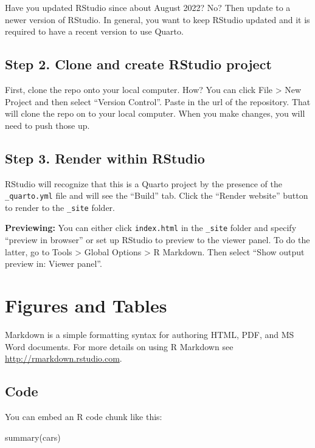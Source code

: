 \documentclass[
  letterpaper,
  oneside,
  open=any]{scrbook}
\newenvironment{Shaded}{\begin{snugshade}}{\end{snugshade}}
\newcommand{\FunctionTok}[1]{\textcolor[rgb]{0.28,0.35,0.67}{#1}}
\newcommand{\NormalTok}[1]{\textcolor[rgb]{0.00,0.23,0.31}{#1}}
\begin{document}
Have you updated RStudio since about August 2022? No? Then update to a
newer version of RStudio. In general, you want to keep RStudio updated
and it is required to have a recent version to use Quarto.

\section{Step 2. Clone and create RStudio
project}\label{step-2.-clone-and-create-rstudio-project}

First, clone the repo onto your local computer. How? You can click File
\textgreater{} New Project and then select ``Version Control''. Paste in
the url of the repository. That will clone the repo on to your local
computer. When you make changes, you will need to push those up.

\section{Step 3. Render within
RStudio}\label{step-3.-render-within-rstudio}

RStudio will recognize that this is a Quarto project by the presence of
the \texttt{\_quarto.yml} file and will see the ``Build'' tab. Click the
``Render website'' button to render to the \texttt{\_site} folder.

\textbf{Previewing:} You can either click \texttt{index.html} in the
\texttt{\_site} folder and specify ``preview in browser'' or set up
RStudio to preview to the viewer panel. To do the latter, go to Tools
\textgreater{} Global Options \textgreater{} R Markdown. Then select
``Show output preview in: Viewer panel''.


\chapter{Figures and Tables}\label{figures-and-tables}

Markdown is a simple formatting syntax for authoring HTML, PDF, and MS
Word documents. For more details on using R Markdown see
\url{http://rmarkdown.rstudio.com}.

\section{Code}\label{code}

You can embed an R code chunk like this:

\begin{Shaded}
\begin{Highlighting}[]
\FunctionTok{summary}\NormalTok{(cars)}
\end{Highlighting}
\end{Shaded}
\end{document}

